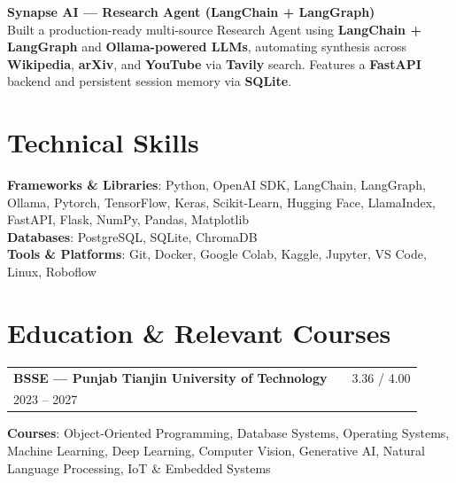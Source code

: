 \documentclass[a4paper,12pt]{article}
\begin{document}
\vspace{4pt}

\textbf{Synapse AI — Research Agent (LangChain + LangGraph)} \\
Built a production-ready multi-source Research Agent using \textbf{LangChain + LangGraph} and \textbf{Ollama-powered LLMs}, automating synthesis across \textbf{Wikipedia}, \textbf{arXiv}, and \textbf{YouTube} via \textbf{Tavily} search. Features a \textbf{FastAPI} backend and persistent session memory via \textbf{SQLite}.

\section{Technical Skills}
\textbf{Frameworks \& Libraries}: Python, OpenAI SDK, LangChain, LangGraph, Ollama, Pytorch, TensorFlow, Keras, Scikit-Learn, Hugging Face, LlamaIndex, FastAPI, Flask, NumPy, Pandas, Matplotlib \\
\textbf{Databases}: PostgreSQL, SQLite, ChromaDB \\
\textbf{Tools \& Platforms}: Git, Docker, Google Colab, Kaggle, Jupyter, VS Code, Linux, Roboflow

\section{Education \& Relevant Courses}
\begin{tabularx}{\linewidth}{@{}l X r@{}}
  \textbf{BSSE — Punjab Tianjin University of Technology} & & 3.36 / 4.00 \\
  2023 -- 2027 & & \\
\end{tabularx}

\vspace{4pt}
\textbf{Courses}: Object-Oriented Programming, Database Systems, Operating Systems, Machine Learning, Deep Learning, Computer Vision, Generative AI, Natural Language Processing, IoT \& Embedded Systems
\end{document}
